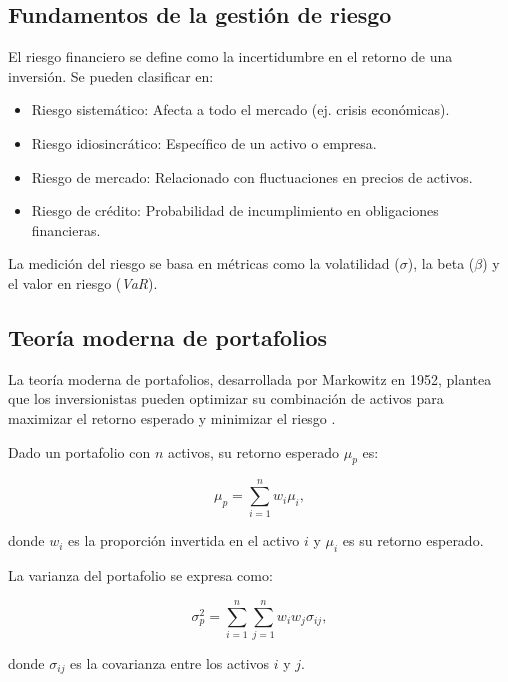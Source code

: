 \begin{itemize}
		\subsection{Fundamentos de la gestión de riesgo}
		
		El riesgo financiero se define como la incertidumbre en el retorno de una inversión. Se pueden clasificar en:
		
		\begin{itemize}
			\item Riesgo sistemático: Afecta a todo el mercado (ej. crisis económicas).
			\item Riesgo idiosincrático: Específico de un activo o empresa.
			\item Riesgo de mercado: Relacionado con fluctuaciones en precios de activos.
			\item Riesgo de crédito: Probabilidad de incumplimiento en obligaciones financieras.
		\end{itemize}
		
		La medición del riesgo se basa en métricas como la volatilidad (\(\sigma\)), la beta (\(\beta\)) y el valor en riesgo (\textit{VaR}).
		
		\subsection{Teoría moderna de portafolios}
		
		La teoría moderna de portafolios, desarrollada por Markowitz en 1952, plantea que los inversionistas pueden optimizar su combinación de activos para maximizar el retorno esperado y minimizar el riesgo \cite{markowitz1952portfolio}.
		
		Dado un portafolio con \( n \) activos, su retorno esperado \( \mu_p \) es:
		
		\begin{equation}
			\mu_p = \sum_{i=1}^{n} w_i \mu_i,
		\end{equation}
		
		donde \( w_i \) es la proporción invertida en el activo \( i \) y \( \mu_i \) es su retorno esperado.
		
		La varianza del portafolio se expresa como:
		
		\begin{equation}
			\sigma_p^2 = \sum_{i=1}^{n} \sum_{j=1}^{n} w_i w_j \sigma_{ij},
		\end{equation}
		
		donde \( \sigma_{ij} \) es la covarianza entre los activos \( i \) y \( j \).
		

\end{itemize}
